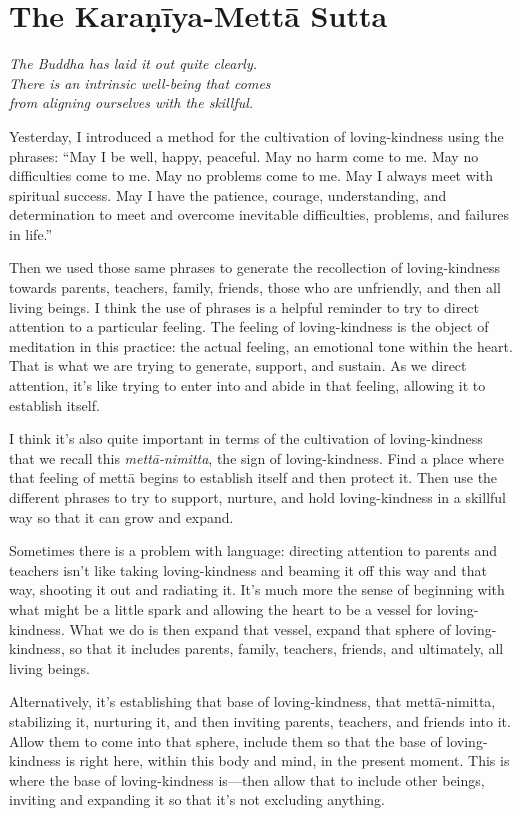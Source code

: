 \chapter{The Karaṇīya-Mettā
Sutta}

\epigraph{\emph{The Buddha has laid it out quite clearly.\\There is an
intrinsic well-being that comes\\from aligning ourselves with the
skillful.}}{}

Yesterday, I introduced a method for the cultivation of loving-kindness
using the phrases: “May I be well, happy, peaceful. May no harm come to
me. May no difficulties come to me. May no problems come to me. May I
always meet with spiritual success. May I have the patience, courage,
understanding, and determination to meet and overcome inevitable
difficulties, problems, and failures in life.”

Then we used those same phrases to generate the recollection of
loving-kindness towards parents, teachers, family, friends, those who
are unfriendly, and then all living beings. I think the use of phrases
is a helpful reminder to try to direct attention to a particular
feeling. The feeling of loving-kindness is the object of meditation in
this practice: the actual feeling, an emotional tone within the heart.
That is what we are trying to generate, support, and sustain. As we
direct attention, it’s like trying to enter into and abide in that
feeling, allowing it to establish itself.

I think it’s also quite important in terms of the cultivation of
loving-kindness that we recall this \emph{mettā-nimitta}, the sign of
loving-kindness. Find a place where that feeling of mettā begins to
establish itself and then protect it. Then use the different phrases to
try to support, nurture, and hold loving-kindness in a skillful way so
that it can grow and expand.

Sometimes there is a problem with language: directing attention to
parents and teachers isn’t like taking loving-kindness and beaming it
off this way and that way, shooting it out and radiating it. It’s much
more the sense of beginning with what might be a little spark and
allowing the heart to be a vessel for loving-kindness. What we do is
then expand that vessel, expand that sphere of loving-kindness, so that
it includes parents, family, teachers, friends, and ultimately, all
living beings.

Alternatively, it’s establishing that base of loving-kindness, that
mettā-nimitta, stabilizing it, nurturing it, and then inviting parents,
teachers, and friends into it. Allow them to come into that sphere,
include them so that the base of loving-kindness is right here, within
this body and mind, in the present moment. This is where the base of
loving-kindness is—then allow that to include other beings, inviting and
expanding it so that it’s not excluding anything.

